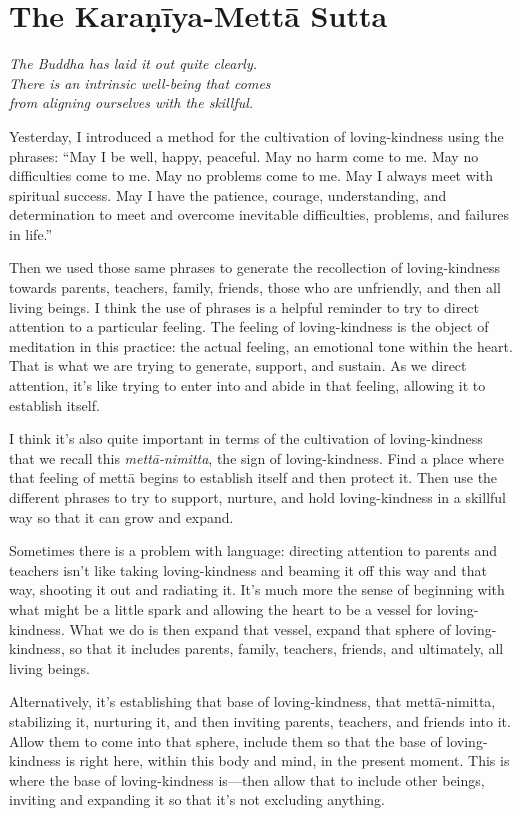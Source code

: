 \chapter{The Karaṇīya-Mettā
Sutta}

\epigraph{\emph{The Buddha has laid it out quite clearly.\\There is an
intrinsic well-being that comes\\from aligning ourselves with the
skillful.}}{}

Yesterday, I introduced a method for the cultivation of loving-kindness
using the phrases: “May I be well, happy, peaceful. May no harm come to
me. May no difficulties come to me. May no problems come to me. May I
always meet with spiritual success. May I have the patience, courage,
understanding, and determination to meet and overcome inevitable
difficulties, problems, and failures in life.”

Then we used those same phrases to generate the recollection of
loving-kindness towards parents, teachers, family, friends, those who
are unfriendly, and then all living beings. I think the use of phrases
is a helpful reminder to try to direct attention to a particular
feeling. The feeling of loving-kindness is the object of meditation in
this practice: the actual feeling, an emotional tone within the heart.
That is what we are trying to generate, support, and sustain. As we
direct attention, it’s like trying to enter into and abide in that
feeling, allowing it to establish itself.

I think it’s also quite important in terms of the cultivation of
loving-kindness that we recall this \emph{mettā-nimitta}, the sign of
loving-kindness. Find a place where that feeling of mettā begins to
establish itself and then protect it. Then use the different phrases to
try to support, nurture, and hold loving-kindness in a skillful way so
that it can grow and expand.

Sometimes there is a problem with language: directing attention to
parents and teachers isn’t like taking loving-kindness and beaming it
off this way and that way, shooting it out and radiating it. It’s much
more the sense of beginning with what might be a little spark and
allowing the heart to be a vessel for loving-kindness. What we do is
then expand that vessel, expand that sphere of loving-kindness, so that
it includes parents, family, teachers, friends, and ultimately, all
living beings.

Alternatively, it’s establishing that base of loving-kindness, that
mettā-nimitta, stabilizing it, nurturing it, and then inviting parents,
teachers, and friends into it. Allow them to come into that sphere,
include them so that the base of loving-kindness is right here, within
this body and mind, in the present moment. This is where the base of
loving-kindness is—then allow that to include other beings, inviting and
expanding it so that it’s not excluding anything.

